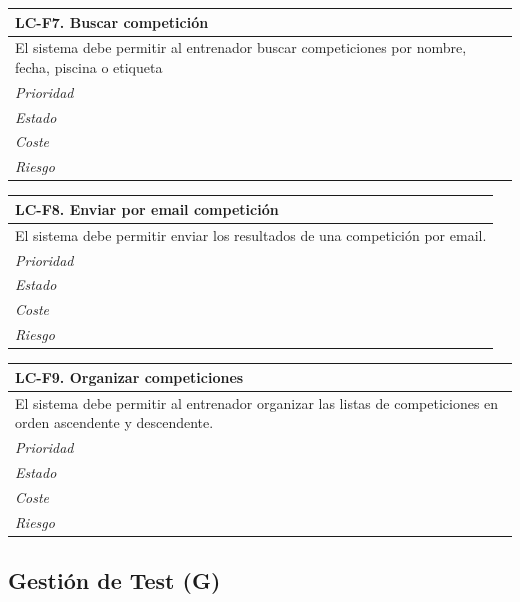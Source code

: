	\begin{center}
		\begin{tabularx}{15cm}{|X|}
			\hline 
				\bf{LC-F7. Buscar competición}\\
			\hline
				El sistema debe permitir al entrenador buscar competiciones por nombre, fecha, piscina o etiqueta\\
			\hline
				\it{Prioridad}\\
			\hline
				\it{Estado}\\
			\hline
				\it{Coste}\\
			\hline
				\it{Riesgo}\\
			\hline
		\end{tabularx}
	\end{center}
	
	\begin{center}
		\begin{tabularx}{15cm}{|X|}
			\hline 
				\bf{LC-F8. Enviar por email competición}\\
			\hline
				El sistema debe permitir enviar los resultados de una competición por email.\\
			\hline
				\it{Prioridad}\\
			\hline
				\it{Estado}\\
			\hline
				\it{Coste}\\
			\hline
				\it{Riesgo}\\
			\hline
		\end{tabularx}
	\end{center}
	
	\begin{center}
		\begin{tabularx}{15cm}{|X|}
			\hline 
				\bf{LC-F9. Organizar competiciones}\\
			\hline
				El sistema debe permitir al entrenador organizar las listas de competiciones en orden ascendente y descendente.\\
			\hline
				\it{Prioridad}\\
			\hline
				\it{Estado}\\
			\hline
				\it{Coste}\\
			\hline
				\it{Riesgo}\\
			\hline
		\end{tabularx}
	\end{center}
	

%
%
\subsection{Gestión de Test (G)} %
	\label{sub:gestion_de_test}

